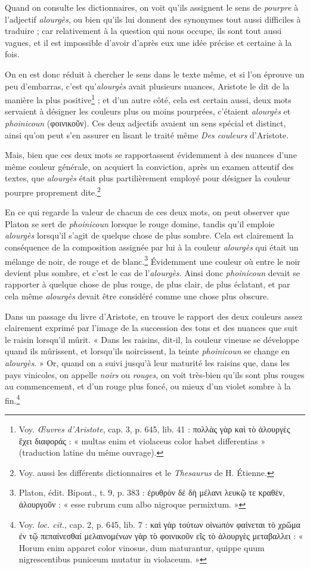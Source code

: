 \documentclass[a4paper, 11pt, oneside, polutonikogreek, french]{article}
\begin{document}
Quand on consulte les dictionnaires, on voit qu'ils assignent le sens de \emph{pourpre} à l'adjectif \emph{alourgès}, ou bien qu'ils lui donnent des synonymes tout aussi difficiles à traduire ; car relativement à la question qui nous occupe, ils sont tout aussi vagues, et il est impossible d'avoir d'après eux une idée précise et certaine à la fois.

On en est donc réduit à chercher le sens dans le texte même, et si l'on éprouve un peu d'embarras, c'est qu'\emph{alourgès} avait plusieurs nuances, Aristote le dit de la manière la plus positive\footnote{Voy. \emph{Œuvres d'Aristote}, cap. 3, p. 645, lib. 41 : πολλὰς γὰρ καὶ τὸ ἁλουργὲς ἓχει διαφοράς : « multas enim et violaceus color habet differentias » (traduction latine du même ouvrage).} ; et d'un autre côté, cela est certain aussi, deux mots servaient à désigner les couleurs plus ou moins pourprées, c'étaient \emph{alourgès} et \emph{phoinicoun} (φοινικοῦν). Ces deux adjectifs avaient un sens spécial et distinct, ainsi qu'on peut s'en assurer en lisant le traité même \emph{Des couleurs} d'Aristote.

Mais, bien que ces deux mots se rapportassent évidemment à des nuances d'une même couleur générale, on acquiert la conviction, après un examen attentif des textes, que \emph{alourgès} était plus partilièrement employé pour désigner la couleur pourpre proprement dite.\footnote{Voy. aussi les différents dictionnaires et le \emph{Thesaurus} de H. Étienne.}

En ce qui regarde la valeur de chacun de ces deux mots, on peut observer que Platon se sert de \emph{phoinicoun} lorsque le rouge domine, tandis qu'il emploie \emph{alourgès} lorsqu'il s'agit de quelque chose de plus sombre. Cela est clairement la conséquence de la composition assignée par lui à la couleur \emph{alourgès} qui était un mélange de noir, de rouge et de blanc.\footnote{Platon, édit. Bipont., t. 9, p. 383 : ἐρυθρὸν δέ δὴ μέλανι λευκῷ τε κραθὲν, ἁλουργοῦν : « esse rubrum cum albo nigroque permixtum. »} Évidemment une couleur où entre le noir devient plus sombre, et c'est le cas de l'\emph{alourgès}. Ainsi donc \emph{phoinicoun} devait se rapporter à quelque chose de plus rouge, de plus clair, de plus éclatant, et par cela même \emph{alourgès} devait être considéré comme une chose plus obscure.

Dans un passage du livre d'Aristote, en trouve le rapport des deux couleurs assez clairement exprimé par l'image de la succession des tons et des nuances que suit le raisin lorsqu'il mûrit. « Dans les raisins, dit-il, la couleur vineuse se développe quand ils mûrissent, et lorsqu'ils noircissent, la teinte \emph{phoinicoun} se change en \emph{alourgès}. » Or, quand on a suivi jusqu'à leur maturité les raisins que, dans les pays vinicoles, on appelle \emph{noirs} ou \emph{rouges}, on voit très-bien qu'ils sont plus rouges au commencement, et d'un rouge plus foncé, ou mieux d'un violet sombre à la fin.\footnote{Voy. \emph{loc. cit.}, cap. 2, p. 645, lib. 7 : καὶ γὰρ τούτων οἰνωπὸν φαίνεται τὸ χρῶμα ἐν τῷ πεπαίνεσθαί μελαινομένων γὰρ τὸ φοινικοῦν εῖς τὸ ἁλουργὲς μεταβαλλει : « Horum enim apparet color vinosus, dum maturantur, quippe quum nigrescentibus puniceum mutatur in violaceum. »}
\end{document}

